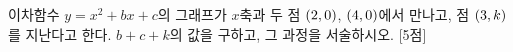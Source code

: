 이차함수 $y=x^2+bx+c$의 그래프가 $x$축과 두 점 $(2{,}\mkern3mu 0)$, $(4{,}\mkern3mu 0)$에서 만나고, 점 $(3{,}\mkern3mu k)$를 지난다고 한다. $b+c+k$의 값을 구하고, 그 과정을 서술하시오.  \mbox{[5점]}
